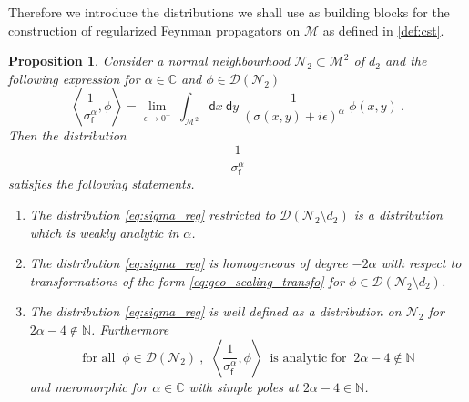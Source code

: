 \documentclass[11pt]{book}
\newcommand{\sm}[1]{\left\langle#1\right\rangle}
\newcommand{\Dcal}{\mathcal{D}}
\newcommand{\Mcal}{\mathcal{M}}
\newcommand{\Ncal}{\mathcal{N}}
\newcommand{\Cbb}{\mathbb{C}}
\newcommand{\Nbb}{\mathbb{N}}
\newcommand{\dsf}{\mathsf{d}}
\newcommand{\fsf}{\mathsf{f}}
\theoremstyle{break}
\newtheorem{proposition}{Proposition}[chapter]
\begin{document}
Therefore we introduce the distributions we shall use as building blocks for the construction of regularized Feynman propagators on $\Mcal$ as defined in \ref{def:cst}. 


\begin{proposition}\label{prop:sigma_1}
Consider a normal neighbourhood $\Ncal_2 \subset\Mcal^2$ of $d_2$ and the following expression for $\alpha \in \Cbb$ and $\phi \in \Dcal(\Ncal_2)$
%
\begin{equation*}
\sm{ \frac{1}{\sigma^\alpha_\fsf} , \phi } = \lim_{\epsilon \to 0^+ } \ \int_{\Mcal^2} \dsf x \ \dsf y \ \frac{1}{(\sigma(x,y)+i\epsilon)^{\alpha}} \ \phi(x,y) \ .
\end{equation*}
%
Then the distribution
%
\begin{equation}
\frac{1}{\sigma_\fsf^\alpha}
\label{eq:sigma_reg}
\end{equation}
%
satisfies the following statements.
%
\begin{enumerate}
%
\item\label{item:1_sigma_1} The distribution \eqref{eq:sigma_reg} restricted to $\Dcal(\Ncal_2 \setminus d_2)$ is a distribution which is weakly analytic in $\alpha$.
%
\item\label{item:2_sigma_1} The distribution \eqref{eq:sigma_reg} is homogeneous of degree $-2\alpha$ with respect to transformations of the form \eqref{eq:geo_scaling_transfo} for $\phi \in \Dcal(\Ncal_2\setminus d_2)$.
%
\item\label{item:3_sigma_1} The distribution \eqref{eq:sigma_reg} is well defined as a distribution on $\Ncal_2$ for $2\alpha-4 \notin \Nbb$. Furthermore
%
\begin{equation*}
\mbox{for all } \ \phi \in \Dcal(\Ncal_2) \ , \ \ \sm{ \frac{1}{\sigma^\alpha_\fsf} , \phi } \ \mbox{ is analytic for } \ 2\alpha-4\notin \Nbb 
\end{equation*}
%
and meromorphic for $\alpha \in \Cbb$ with simple poles at $2\alpha-4\in \mathbb{N}$. 
%
\end{enumerate}
%
\end{proposition}
\end{document}
